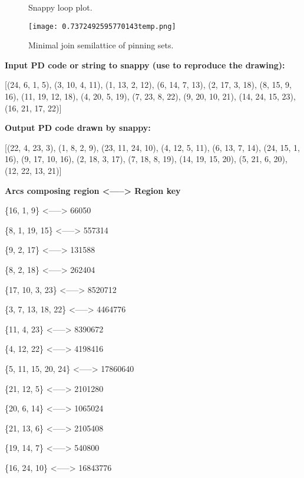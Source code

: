 \documentclass{article}%
\begin{document}
\begin{multicols}{2}
\begin{figure}[H]
\centering

\caption{Snappy loop plot.}
\label{fig:0.33866755511928137temp.svg}
\end{figure}\columnbreak

\begin{figure}[H]
\centering
\texttt{[image: 0.7372492595770143temp.png]}
\caption{Minimal join semilattice of pinning sets.}
\label{fig:0.7372492595770143temp.png}
\end{figure}\end{multicols}\newpage\begin{multicols}{2}
\textbf{Input PD code or string to snappy (use to reproduce the drawing):}

	[(24, 6, 1, 5), (3, 10, 4, 11), (1, 13, 2, 12), (6, 14, 7, 13), (2, 17, 3, 18), (8, 15, 9, 16), (11, 19, 12, 18), (4, 20, 5, 19), (7, 23, 8, 22), (9, 20, 10, 21), (14, 24, 15, 23), (16, 21, 17, 22)]

\textbf{Output PD code drawn by snappy:}

	[(22, 4, 23, 3), (1, 8, 2, 9), (23, 11, 24, 10), (4, 12, 5, 11), (6, 13, 7, 14), (24, 15, 1, 16), (9, 17, 10, 16), (2, 18, 3, 17), (7, 18, 8, 19), (14, 19, 15, 20), (5, 21, 6, 20), (12, 22, 13, 21)]


\textbf{Arcs composing region <-----> Region key}

\{{16, 1, 9}\} <-----> 66050

\{{8, 1, 19, 15}\} <-----> 557314

\{{9, 2, 17}\} <-----> 131588

\{{8, 2, 18}\} <-----> 262404

\{{17, 10, 3, 23}\} <-----> 8520712

\{{3, 7, 13, 18, 22}\} <-----> 4464776

\{{11, 4, 23}\} <-----> 8390672

\{{4, 12, 22}\} <-----> 4198416

\{{5, 11, 15, 20, 24}\} <-----> 17860640

\{{21, 12, 5}\} <-----> 2101280

\{{20, 6, 14}\} <-----> 1065024

\{{21, 13, 6}\} <-----> 2105408

\{{19, 14, 7}\} <-----> 540800

\{{16, 24, 10}\} <-----> 16843776


\columnbreak


\end{multicols}
\end{document}
